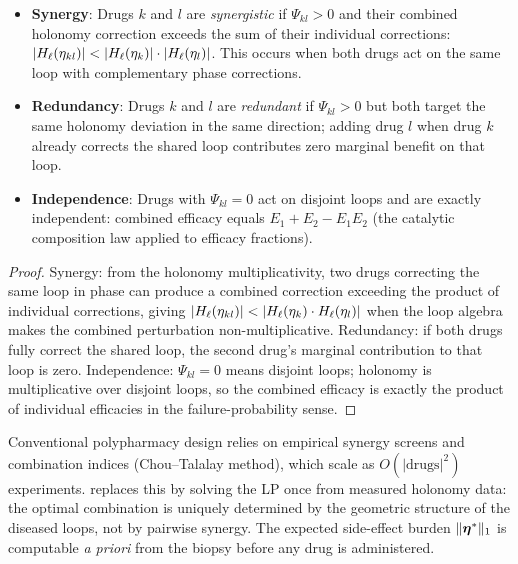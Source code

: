 \begin{proposition}
\label{prop:synergy-redundancy}
\begin{itemize}[leftmargin=2em]
  \item \textbf{Synergy}: Drugs $k$ and $l$ are \emph{synergistic} if
    $\Psi_{kl} > 0$ and their combined holonomy correction exceeds the sum
    of their individual corrections:
    $|H_\ell(\eta_{kl})| < |H_\ell(\eta_k)| \cdot |H_\ell(\eta_l)|$.
    This occurs when both drugs act on the same loop with complementary
    phase corrections.
  \item \textbf{Redundancy}: Drugs $k$ and $l$ are \emph{redundant} if
    $\Psi_{kl} > 0$ but both target the same holonomy deviation in the
    same direction; adding drug $l$ when drug $k$ already corrects the
    shared loop contributes zero marginal benefit on that loop.
  \item \textbf{Independence}: Drugs with $\Psi_{kl} = 0$ act on disjoint
    loops and are exactly independent: combined efficacy equals
    $E_1 + E_2 - E_1 E_2$ (the catalytic composition law applied to
    efficacy fractions).
\end{itemize}
\end{proposition}

\begin{proof}
Synergy: from the holonomy multiplicativity, two drugs correcting the same
loop in phase can produce a combined correction exceeding the product of
individual corrections, giving $|H_\ell(\eta_{kl})| < |H_\ell(\eta_k) \cdot
H_\ell(\eta_l)|$ when the loop algebra makes the combined perturbation
non-multiplicative.
Redundancy: if both drugs fully correct the shared loop, the second drug's
marginal contribution to that loop is zero.
Independence: $\Psi_{kl} = 0$ means disjoint loops; holonomy is multiplicative
over disjoint loops, so the combined efficacy is exactly the product of
individual efficacies in the failure-probability sense.
\end{proof}

\begin{remark}
Conventional polypharmacy design relies on empirical synergy screens and
combination indices (Chou--Talalay method), which scale as $O(|\text{drugs}|^2)$
experiments.   replaces this by solving the LP once
from measured holonomy data: the optimal combination is uniquely determined
by the geometric structure of the diseased loops, not by pairwise synergy.
The expected side-effect burden $\|\boldsymbol{\eta}^*\|_1$ is computable \emph{a priori}
from the biopsy before any drug is administered.
\end{remark}

